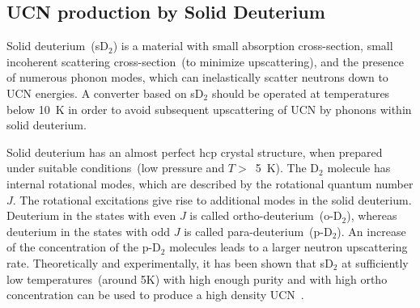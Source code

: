 


\subsection{UCN production by Solid Deuterium}
Solid deuterium~(sD$_2$) is a material with small absorption
cross-section, small incoherent scattering cross-section~(to minimize
upscattering), and the presence of numerous phonon modes, which can
inelastically scatter neutrons down to UCN energies.
A converter based on sD$_2$ should be operated at temperatures below
10~K in order to avoid subsequent upscattering of UCN by phonons
within solid deuterium.
 
Solid deuterium has an almost perfect hcp crystal structure, when
prepared under suitable conditions~(low pressure and $T >$~5~K). The
D$_2$ molecule has internal rotational modes, which are described by
the rotational quantum number $J$. The rotational excitations give
rise to additional modes in the solid deuterium.
Deuterium in the states with even $J$ is called
ortho-deuterium~(o-D$_2$), whereas deuterium in the states with odd
$J$ is called para-deuterium~(p-D$_2$). An increase of the
concentration of the p-D$_2$ molecules leads to a larger neutron
upscattering rate.
Theoretically and experimentally, it has been shown that sD$_2$ at
sufficiently low temperatures~(around 5K) with high enough purity and
with high ortho concentration can be used to produce a high density
UCN~\cite{Atchison2005}.

